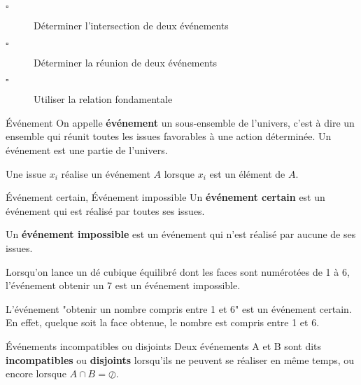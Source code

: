 \begin{titre}[Probabilités]

\end{titre}


\begin{CpsCol}
\begin{description}
\item[$\square$] Déterminer l'intersection de deux événements
\item[$\square$] Déterminer la réunion de deux événements
\item[$\square$] Utiliser la relation fondamentale
\end{description}
\end{CpsCol}

 
\begin{DefT}{Événement}
On appelle \textbf{événement} un sous-ensemble de l'univers, c'est à dire un ensemble qui réunit toutes les issues favorables à une action déterminée. Un événement est une partie de l'univers.
\end{DefT}


\begin{Rq}
Une issue $x_i$ réalise un événement $A$ lorsque $x_i$ est un élément de $A$.
\end{Rq}

\begin{DefT}{Événement certain, Événement impossible} 
Un \textbf{événement certain} est un événement qui est réalisé par toutes ses issues.

Un \textbf{événement impossible} est un événement qui n'est réalisé par aucune de ses issues.
\end{DefT}

\begin{Ex}
Lorsqu'on lance un dé cubique équilibré dont les faces sont numérotées de 1 à 6, l'événement obtenir un 7 est un événement impossible. 

L'événement "obtenir un nombre compris entre 1 et 6" est un événement certain. En effet, quelque soit la face obtenue, le nombre est compris entre 1 et 6.
\end{Ex}


\begin{DefT}{Événements incompatibles ou disjoints} 
Deux événements A et B sont dits \textbf{incompatibles} ou \textbf{disjoints} lorsqu'ils ne peuvent se réaliser en même temps,
ou encore lorsque $A \cap B = \oslash$.
\end{DefT}

